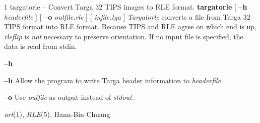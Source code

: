 \newpage


%
%
%
 1
targatorle -- Convert Targa 32 TIPS images to RLE format.
{\bf targatorle}
[
{\bf --h}
{\it headerfile}
]
[
{\bf --o}
{\it outfile.rle}
] [
{\it infile.tga}
]
{\it Targatorle}
converts a file from Targa 32 TIPS format into RLE format.  Because TIPS and
RLE agree on which end is up,  
{\it rleflip}
is 
{\it not}
necessary to preserve orientation. If no input file is specified, the data is
read from stdin.
\begin{TPlist}{{\bf --h}}
\item[{{\bf --h}}]
Allow the program to write Targa header information to
{\it headerfile}
\item[{{\bf --o}}]
Use 
{\it outfile}
as output instead of 
{\it stdout.}
\end{TPlist}
{\it urt}{\rm (1),}
{\it RLE}{\rm (5).}
Hann-Bin Chuang
\newpage


